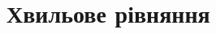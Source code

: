 \documentclass[onlytextwidth]{beamer}
\begin{document}
%
%
%
%
%





\section{Хвильове рівняння}
\end{document}

